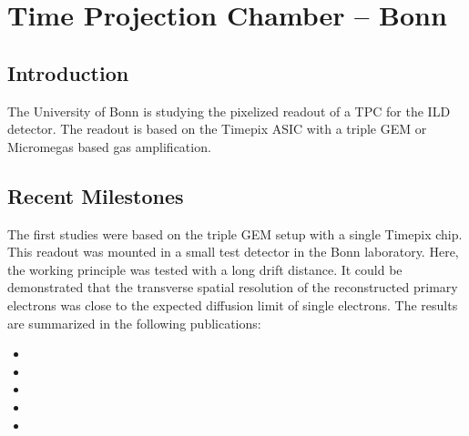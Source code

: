 \section{Time Projection Chamber -- Bonn}
\subsection{Introduction}
The University of Bonn is studying the pixelized readout of a TPC for the ILD detector. The readout is based on the Timepix ASIC with a triple GEM or Micromegas based gas amplification.

\subsection{Recent Milestones}
The first studies were based on the triple GEM setup with a single Timepix chip. This readout was mounted in a small test detector in the Bonn laboratory. Here, the working principle was tested with a long drift distance. It could be demonstrated that the transverse spatial resolution of the reconstructed primary electrons was close to the expected diffusion limit of single electrons. The results are summarized in the following publications:
\begin{itemize}
\item {}
\item {}
\item {}
\item {}
\item {}
\end{itemize}

